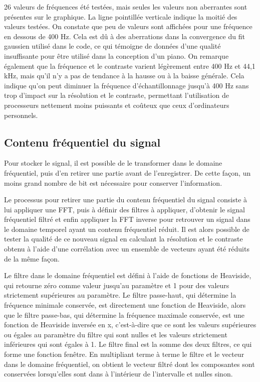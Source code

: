 ﻿\documentclass[11pt,letterpaper]{article}
\begin{document}
26 valeurs de fréquences été testées, mais seules les valeurs non aberrantes sont
présentes sur le graphique. La ligne pointillée verticale indique 
la moitié des valeurs testées. On constate  que peu de valeurs sont affichées
pour une fréquence en dessous de 400 Hz. Cela est dû à des aberrations dans
la convergence du fit gaussien utilisé dans le code, ce qui témoigne de 
données d'une qualité insuffisante pour être utilisé dans la conception d'un
piano. 
On remarque également que la fréquence et le contraste varient légèrement entre 
400 Hz et 44,1 kHz, mais qu'il n'y a pas de tendance à la hausse ou à la baisse 
générale. Cela indique qu'on peut diminuer la fréquence d'échantillonnage 
jusqu'à 400 Hz sans trop d'impact sur la résolution et le contraste, permettant
l'utilisation de processeurs nettement moins puissants et coûteux que ceux d'ordinateurs
personnels.

\subsection{Contenu fréquentiel du signal}

Pour stocker le signal, il est possible de le transformer dans le domaine 
fréquentiel, puis d'en retirer une partie avant de l'enregistrer. De cette 
façon, un moins grand nombre de bit est nécessaire pour conserver l'information.

Le processus pour retirer une partie du contenu fréquentiel du signal consiste
à lui appliquer une FFT, puis à définir des filtres à appliquer, d'obtenir le
signal fréquentiel filtré et enfin appliquer la FFT inverse pour retrouver
un signal dans le domaine temporel ayant un contenu fréquentiel réduit. 
Il est alors possible de tester la qualité de ce nouveau signal en calculant
la résolution et le contraste obtenu à l'aide d'une corrélation avec un 
ensemble de vecteurs ayant été réduits de la même façon. 

Le filtre dans le domaine fréquentiel est défini à l'aide de fonctions de 
Heaviside, qui retourne zéro comme valeur jusqu'au paramètre et 1 pour des valeurs 
strictement supérieures au paramètre.
Le filtre passe-haut, qui détermine la fréquence minimale conservée, est directement
une fonction de Heaviside, alors que le filtre passe-bas, qui détermine la fréquence 
maximale conservée, est une fonction de Heaviside inversée en x, c'est-à-dire que ce 
sont les valeurs supérieures ou égales au paramètre du filtre qui sont nulles et les
valeurs strictement inférieures qui sont égales à 1. Le filtre final est la somme des
deux filtres, ce qui forme une fonction fenêtre.
En multipliant terme à terme le filtre et le vecteur dans le domaine fréquentiel, on 
obtient le vecteur filtré dont les composantes sont conservées lorsqu'elles sont dans 
à l'intérieur de l'intervalle et nulles sinon.
\end{document}
